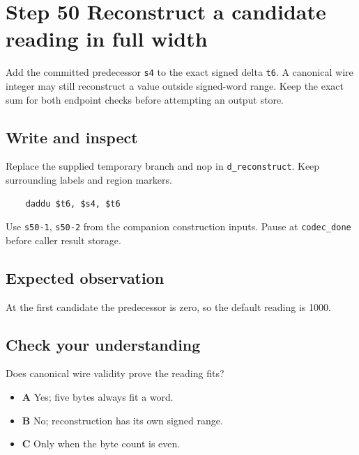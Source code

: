 \section{Step 50 Reconstruct a candidate reading in full width}\label{delta-s50}

Add the committed predecessor \texttt{s4} to the exact signed delta \texttt{t6}. A canonical wire integer may still reconstruct a value outside signed-word range. Keep the exact sum for both endpoint checks before attempting an output store.

\subsection{Write and inspect}
Replace the supplied temporary branch and nop in \texttt{d\_reconstruct}. Keep surrounding labels and region markers.

\begin{verbatim}
    daddu $t6, $s4, $t6
\end{verbatim}
Use \texttt{s50-1}, \texttt{s50-2} from the companion construction inputs. Pause at \texttt{codec\_done} before caller result storage.

\subsection{Expected observation}
At the first candidate the predecessor is zero, so the default reading is 1000.

\subsection{Check your understanding}
Does canonical wire validity prove the reading fits?

\begin{itemize}
  \item \textbf{A} Yes; five bytes always fit a word.
  \item \textbf{B} No; reconstruction has its own signed range.
  \item \textbf{C} Only when the byte count is even.
\end{itemize}
